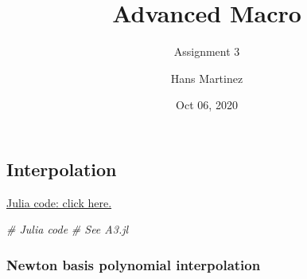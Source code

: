 \documentclass[]{article}
\title{Advanced Macro}
\subtitle{Assignment 3}
\author{Hans Martinez}
\date{Oct 06, 2020}
\newenvironment{Shaded}{\begin{snugshade}}{\end{snugshade}}
\newcommand{\CommentTok}[1]{\textcolor[rgb]{0.56,0.35,0.01}{\textit{#1}}}
\begin{document}
\maketitle

\hypertarget{interpolation}{%
\subsection{Interpolation}\label{interpolation}}

\href{https://github.com/hans-mtz/AdvMacro/blob/master/A3.jl}{Julia
code: click here.}

\begin{Shaded}
\begin{Highlighting}[]
\CommentTok{# Julia code}
\CommentTok{# See A3.jl}
\end{Highlighting}
\end{Shaded}

\hypertarget{newton-basis-polynomial-interpolation}{%
\subsubsection{Newton basis polynomial
interpolation}\label{newton-basis-polynomial-interpolation}}
\end{document}
